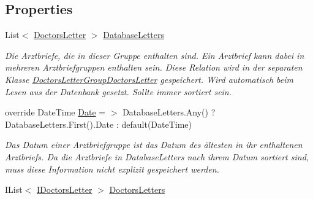 \subsection*{Properties}
\begin{CompactItemize}
\item 
List$<$ \hyperlink{classmy_m_d_1_1_model_1_1_data_model_1_1_doctors_letter}{Doctors\-Letter} $>$ \hyperlink{classmy_m_d_1_1_model_1_1_data_model_1_1_doctors_letter_group_df84ceb32ca80cc7fb3907b660899e4b}{Database\-Letters}
\begin{CompactList}\small\item\em Die Arztbriefe, die in dieser Gruppe enthalten sind. Ein Arztbrief kann dabei in mehreren Arztbriefgruppen enthalten sein. Diese Relation wird in der separaten Klasse \hyperlink{classmy_m_d_1_1_model_1_1_data_model_1_1_doctors_letter_group_doctors_letter}{Doctors\-Letter\-Group\-Doctors\-Letter} gespeichert. Wird automatisch beim Lesen aus der Datenbank gesetzt. Sollte immer sortiert sein. \item\end{CompactList}\item 
override Date\-Time \hyperlink{classmy_m_d_1_1_model_1_1_data_model_1_1_doctors_letter_group_44749712dbec183e983dcd78a7736c41}{Date} = $>$ Database\-Letters.Any() ? Database\-Letters.First().Date : default(Date\-Time)
\begin{CompactList}\small\item\em Das Datum einer Arztbriefgruppe ist das Datum des \"{a}ltesten in ihr enthaltenen Arztbriefs. Da die Arztbriefe in Database\-Letters nach ihrem Datum sortiert sind, muss diese Information nicht explizit gespeichert werden. \item\end{CompactList}\item 
\hypertarget{classmy_m_d_1_1_model_1_1_data_model_1_1_doctors_letter_group_54718291c29adece386cab47aaf27f45}{
IList$<$ \hyperlink{interfacemy_m_d_1_1_model_interface_1_1_data_model_interface_1_1_i_doctors_letter}{IDoctors\-Letter} $>$ \hyperlink{classmy_m_d_1_1_model_1_1_data_model_1_1_doctors_letter_group_54718291c29adece386cab47aaf27f45}{Doctors\-Letters}}
\label{db/dfe/classmy_m_d_1_1_model_1_1_data_model_1_1_doctors_letter_group_54718291c29adece386cab47aaf27f45}


\end{CompactItemize}
